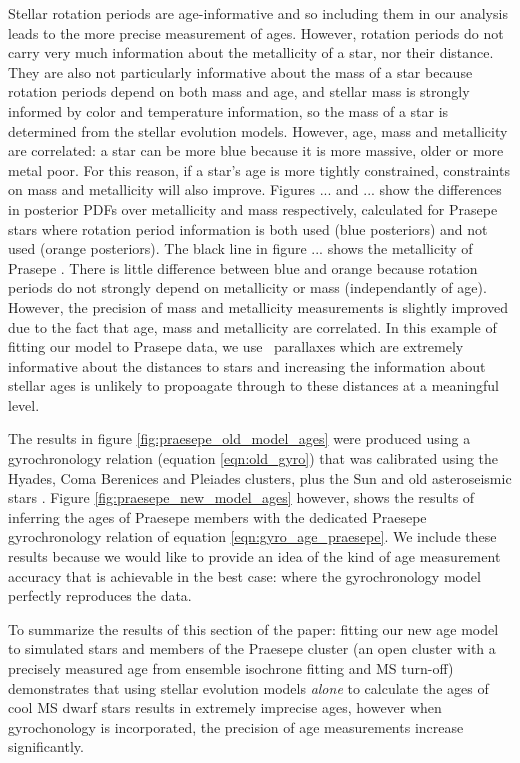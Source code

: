Stellar rotation periods are age-informative and so including them in our
analysis leads to the more precise measurement of ages.
However, rotation periods do not carry very much information about the
metallicity of a star, nor their distance.
They are also not particularly informative about the mass of a star because
rotation periods depend on both mass and age, and stellar mass is strongly
informed by color and temperature information, so the mass of a star is
determined from the stellar evolution models.
However, age, mass and metallicity are correlated: a star can be more blue
because it is more massive, older or more metal poor.
For this reason, if a star's age is more tightly constrained, constraints on
mass and metallicity will also improve.
Figures ... and ... show the differences in posterior PDFs over metallicity
and mass respectively, calculated for Prasepe stars where rotation period
information is both used (blue posteriors) and not used (orange posteriors).
The black line in figure ... shows the metallicity of Prasepe
.
There is little difference between blue and orange because rotation periods do
not strongly depend on metallicity or mass (independantly of age).
However, the precision of mass and metallicity measurements is slightly
improved due to the fact that age, mass and metallicity are correlated.
In this example of fitting our model to Prasepe data, we use \gaia\ parallaxes
which are extremely informative about the distances to stars and increasing
the information about stellar ages is unlikely to propoagate through to these
distances at a meaningful level.

The results in figure \ref{fig:praesepe_old_model_ages} were produced using a
gyrochronology relation (equation \ref{eqn:old_gyro}) that was calibrated
using the Hyades, Coma Berenices and Pleiades clusters, plus the Sun and old
asteroseismic stars \citep{angus2015}.
Figure \ref{fig:praesepe_new_model_ages} however, shows the results of
inferring the ages of Praesepe members with the dedicated Praesepe
gyrochronology relation of equation \ref{eqn:gyro_age_praesepe}.
We include these results because we would like to provide an idea of the kind
of age measurement accuracy that is achievable in the best case: where the
gyrochronology model perfectly reproduces the data.

To summarize the results of this section of the paper: fitting our new age
model to simulated stars and members of the Praesepe cluster (an open cluster
with a precisely measured age from ensemble isochrone fitting and MS turn-off)
demonstrates that using stellar evolution models {\it alone} to calculate the
ages of cool MS dwarf stars results in extremely imprecise ages, however when
gyrochonology is incorporated, the precision of age measurements increase
significantly.

